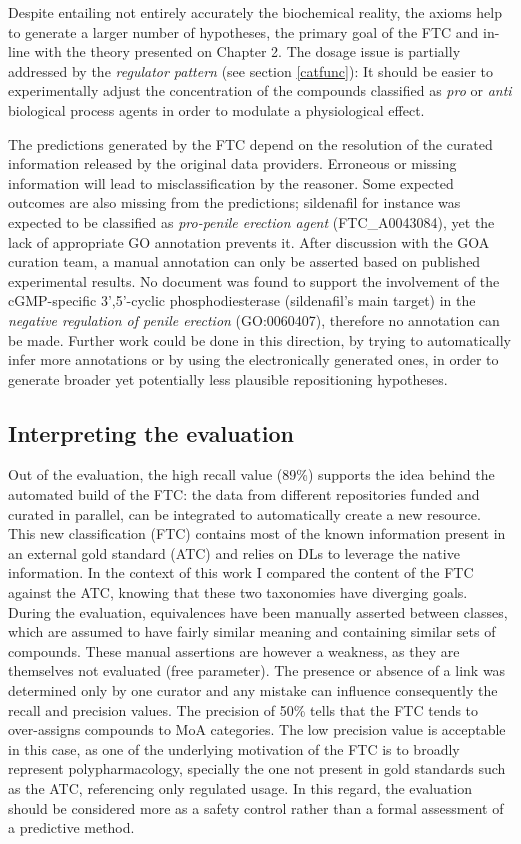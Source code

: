 Despite entailing not entirely accurately the biochemical reality, the axioms help to generate a larger number of hypotheses, the primary goal of the FTC and in-line with the theory presented on Chapter 2. The dosage issue is partially addressed by the \emph{regulator pattern} (see section \ref{catfunc}): It should be easier to experimentally adjust the concentration of the compounds classified as \emph{pro} or \emph{anti} biological process agents in order to modulate a physiological effect.

The predictions generated by the FTC depend on the resolution of the curated information released by the original data providers. Erroneous or missing information will lead to misclassification by the reasoner. Some expected outcomes are also missing from the predictions; sildenafil for instance was expected to be classified as \emph{pro-penile erection agent} (FTC\_A0043084), yet the lack of appropriate GO annotation prevents it. After discussion with the GOA curation team, a manual annotation can only be asserted based on published experimental results. No document was found to support the involvement of the cGMP-specific 3',5'-cyclic phosphodiesterase (sildenafil's main target) in the \emph{negative regulation of penile erection} (GO:0060407), therefore no annotation can be made. Further work could be done in this direction, by trying to automatically infer more annotations or by using the electronically generated ones, in order to generate broader yet potentially less plausible repositioning hypotheses.

\subsection{Interpreting the evaluation}
Out of the evaluation, the high recall value (89\%) supports the idea behind the automated build of the FTC: the data from different repositories funded and curated in parallel, can be integrated to automatically create a new resource. This new classification (FTC) contains most of the known information present in an external gold standard (ATC) and relies on DLs to leverage the native information. In the context of this work I compared the content of the FTC against the ATC, knowing that these two taxonomies have diverging goals. During the evaluation, equivalences have been manually asserted between classes, which are assumed to have fairly similar meaning and containing similar sets of compounds. These manual assertions are however a weakness, as they are themselves not evaluated (free parameter). The presence or absence of a link was determined only by one curator and any mistake can influence consequently the recall and precision values. The precision of 50\% tells that the FTC tends to over-assigns compounds to MoA categories. The low precision value is acceptable in this case, as one of the underlying motivation of the FTC is to broadly represent polypharmacology, specially the one not present in gold standards such as the ATC, referencing only regulated usage. In this regard, the evaluation should be considered more as a safety control rather than a formal assessment of a predictive method.


